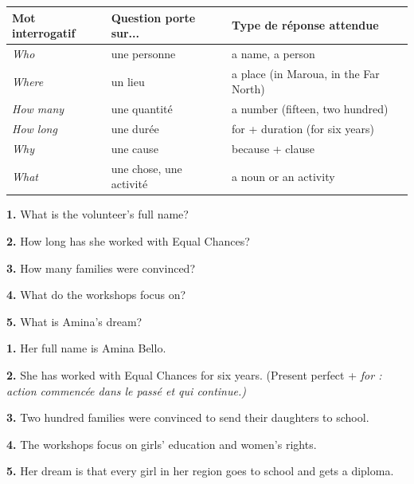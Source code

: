\documentclass[11pt]{article}
\newcommand{\eng}[1]{\ifmmode\text{\textit{#1}}\else\begingroup\selectlanguage{english}\itshape #1\endgroup\fi}
\begin{document}
\begin{center}
\begin{tabularx}{\linewidth}{|l|X|X|}
\hline
\rowcolor{popblueL} \textbf{Mot interrogatif} & \textbf{Question porte sur...} & \textbf{Type de réponse attendue} \\
\hline
\eng{Who} & une personne & a name, a person \\
\hline
\eng{Where} & un lieu & a place (in Maroua, in the Far North) \\
\hline
\eng{How many} & une quantité & a number (fifteen, two hundred) \\
\hline
\eng{How long} & une durée & for + duration (for six years) \\
\hline
\eng{Why} & une cause & because + clause \\
\hline
\eng{What} & une chose, une activité & a noun or an activity \\
\hline
\end{tabularx}
\end{center}

\begin{textebox}
\textbf{1.} What is the volunteer's full name?

\textbf{2.} How long has she worked with Equal Chances?

\textbf{3.} How many families were convinced?

\textbf{4.} What do the workshops focus on?

\textbf{5.} What is Amina's dream?
\end{textebox}

\begin{corrige}
\textbf{1.} Her full name is Amina Bello.

\textbf{2.} She has worked with Equal Chances for six years. (Present perfect + \eng{for} : action commencée dans le passé et qui continue.)

\textbf{3.} Two hundred families were convinced to send their daughters to school.

\textbf{4.} The workshops focus on girls' education and women's rights.

\textbf{5.} Her dream is that every girl in her region goes to school and gets a diploma.
\end{corrige}
\end{document}
